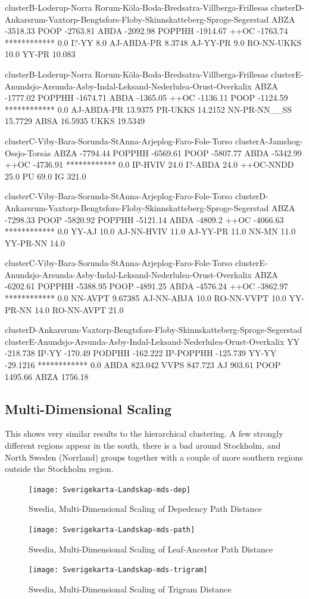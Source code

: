 clusterB-Loderup-Norra Rorum-K\"ola-Boda-Bredsatra-Villberga-Frillesas
clusterD-Ankarsrum-Vaxtorp-Bengtsfors-Floby-Skinnskatteberg-Sproge-Segerstad
ABZA -3518.33
POOP -2763.81
ABDA -2092.98
POPPHH -1914.67
++OC -1763.74
************ 0.0
I?-YY 8.0
AJ-ABDA-PR 8.3748
AJ-YY-PR 9.0
RO-NN-UKKS 10.0
YY-PR 10.083

clusterB-Loderup-Norra Rorum-K\"ola-Boda-Bredsatra-Villberga-Frillesas
clusterE-Anundsjo-Arsunda-Asby-Indal-Leksand-Nederlulea-Orust-Overkalix
ABZA -1777.02
POPPHH -1674.71
ABDA -1365.05
++OC -1136.11
POOP -1124.59
************ 0.0
AJ-ABDA-PR 13.9375
PR-UKKS 14.2152
NN-PR-NN\_\_SS 15.7729
ABSA 16.5935
UKKS 19.5349

clusterC-Viby-Bara-Sorunda-StAnna-Arjeplog-Faro-Fole-Torso
clusterA-Jamshog-Ossjo-Tors\.as
ABZA -7794.44
POPPHH -6569.61
POOP -5807.77
ABDA -5342.99
++OC -4736.91
************ 0.0
IP-HVIV 24.0
I?-ABDA 24.0
++OC-NNDD 25.0
PU 69.0
IG 321.0

clusterC-Viby-Bara-Sorunda-StAnna-Arjeplog-Faro-Fole-Torso
clusterD-Ankarsrum-Vaxtorp-Bengtsfors-Floby-Skinnskatteberg-Sproge-Segerstad
ABZA -7298.33
POOP -5820.92
POPPHH -5121.14
ABDA -4809.2
++OC -4066.63
************ 0.0
YY-AJ 10.0
AJ-NN-HVIV 11.0
AJ-YY-PR 11.0
NN-MN 11.0
YY-PR-NN 14.0

clusterC-Viby-Bara-Sorunda-StAnna-Arjeplog-Faro-Fole-Torso
clusterE-Anundsjo-Arsunda-Asby-Indal-Leksand-Nederlulea-Orust-Overkalix
ABZA -6202.61
POPPHH -5388.95
POOP -4891.25
ABDA -4576.24
++OC -3862.97
************ 0.0
NN-AVPT 9.67385
AJ-NN-ABJA 10.0
RO-NN-VVPT 10.0
YY-PR-NN 14.0
RO-NN-AVPT 21.0

clusterD-Ankarsrum-Vaxtorp-Bengtsfors-Floby-Skinnskatteberg-Sproge-Segerstad
clusterE-Anundsjo-Arsunda-Asby-Indal-Leksand-Nederlulea-Orust-Overkalix
YY -218.738
IP-YY -170.49
PODPHH -162.222
IP-POPPHH -125.739
YY-YY -29.1216
************ 0.0
ABDA 823.042
VVPS 847.723
AJ 903.61
POOP 1495.66
ABZA 1756.18
\subsection{Multi-Dimensional Scaling}

This shows very similar results to the hierarchical clustering. A
few strongly different regions appear in the south, there is a bad
around Stockholm, and North Sweden (Norrland) groups together with a
couple of more southern regions outside the Stockholm region.

\begin{figure}
  \texttt{[image: Sverigekarta-Landskap-mds-dep]}
  \label{mds-dep}
  \caption{Swedia, Multi-Dimensional Scaling of Depedency Path Distance}
\end{figure}
\begin{figure}
  \texttt{[image: Sverigekarta-Landskap-mds-path]}
  \label{mds-path}
  \caption{Swedia, Multi-Dimensional Scaling of Leaf-Ancestor Path Distance}
\end{figure}
\begin{figure}
  \texttt{[image: Sverigekarta-Landskap-mds-trigram]}
  \label{mds-trigram}
  \caption{Swedia, Multi-Dimensional Scaling of Trigram Distance}
\end{figure}

